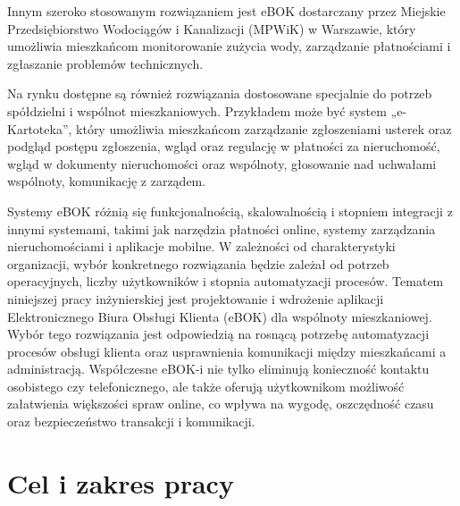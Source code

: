 Innym szeroko stosowanym rozwiązaniem jest eBOK dostarczany przez Miejskie Przedsiębiorstwo Wodociągów i Kanalizacji (MPWiK) w Warszawie, który umożliwia mieszkańcom monitorowanie zużycia wody, zarządzanie płatnościami i zgłaszanie problemów technicznych.

Na rynku dostępne są również rozwiązania dostosowane specjalnie do potrzeb spółdzielni i wspólnot mieszkaniowych. Przykładem może być system „e-Kartoteka”, który umożliwia mieszkańcom zarządzanie zgłoszeniami usterek oraz podgląd postępu zgłoszenia, wgląd oraz regulację w płatności za nieruchomość, wgląd w dokumenty nieruchomości oraz wspólnoty, głosowanie nad uchwałami wspólnoty, komunikację z zarządem. 

Systemy eBOK różnią się funkcjonalnością, skalowalnością i stopniem integracji z innymi systemami, takimi jak narzędzia płatności online, systemy zarządzania nieruchomościami i aplikacje mobilne. W zależności od charakterystyki organizacji, wybór konkretnego rozwiązania będzie zależał od potrzeb operacyjnych, liczby użytkowników i stopnia automatyzacji procesów.
% 
Tematem niniejszej pracy inżynierskiej jest projektowanie i wdrożenie aplikacji Elektronicznego Biura Obsługi Klienta (eBOK) dla wspólnoty mieszkaniowej. Wybór tego rozwiązania jest odpowiedzią na rosnącą potrzebę automatyzacji procesów obsługi klienta oraz usprawnienia komunikacji między mieszkańcami a administracją. Współczesne eBOK-i nie tylko eliminują konieczność kontaktu osobistego czy telefonicznego, ale także oferują użytkownikom możliwość załatwienia większości spraw online, co wpływa na wygodę, oszczędność czasu oraz bezpieczeństwo transakcji i komunikacji.



\section{Cel i zakres pracy}

